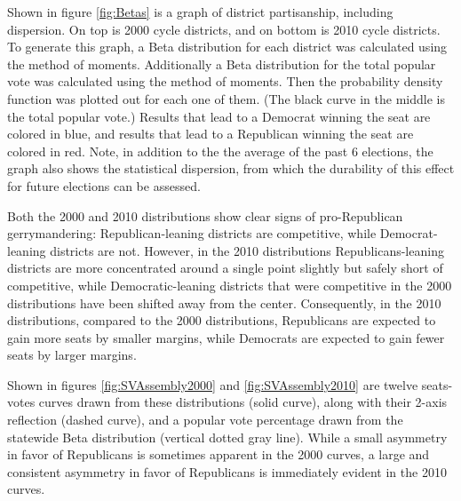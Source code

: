 \documentclass[preprint,12pt]{article}
\begin{document}
Shown in figure \ref{fig:Betas} is a graph of district partisanship, including dispersion.  On top is 2000 cycle districts, and on bottom is 2010 cycle districts.   To generate this graph, a Beta distribution for each district was calculated using the method of moments.  Additionally a Beta distribution for the total popular vote was calculated using the method of moments.  Then the probability density function was plotted out for each one of them.  (The black curve in the middle is the total popular vote.) Results that lead to a Democrat winning the seat are colored in blue, and results that lead to a Republican winning the seat are colored in red.
Note, in addition to the the average of the past 6 elections, the graph also shows the statistical dispersion, from which the durability of this effect for future elections can be assessed.

Both the 2000 and 2010 distributions show clear signs of pro-Republican gerrymandering: Republican-leaning districts are competitive, while Democrat-leaning districts are not.
However, in the 2010 distributions Republicans-leaning districts are more concentrated around a single point slightly but safely short of competitive, while Democratic-leaning districts that were competitive in the 2000 distributions have been shifted away from the center.
Consequently, in the 2010 distributions, compared to the 2000 distributions, Republicans are expected to gain more seats by smaller margins, while Democrats are expected to gain fewer seats by larger margins.

Shown in figures \ref{fig:SVAssembly2000} and \ref{fig:SVAssembly2010} are twelve seats-votes curves drawn from these distributions (solid curve), along with their 2-axis reflection (dashed curve), and a popular vote percentage drawn from the statewide Beta distribution (vertical dotted gray line). 
While a small asymmetry in favor of Republicans is sometimes apparent in the 2000 curves, a large and consistent asymmetry in favor of Republicans is immediately evident in the 2010 curves.
\end{document}
